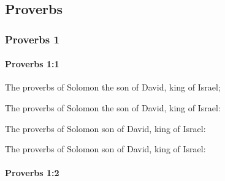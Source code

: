 \subsection{Proverbs}
	\label{PROVERBS}

	\subsubsection{Proverbs 1} %
		\label{PROVERBS-1}

		\paragraph{Proverbs 1:1} %
			\label{PROVERBS-1-1}

			The proverbs of Solomon the son of David, king of Israel;

			\begin{versebox}
					\item[BHS] 
					\item[ASV] The proverbs of Solomon the son of David, king of Israel:
					\item[NIV] The proverbs of Solomon son of David, king of Israel:
					\item[NRSV] The proverbs of Solomon son of David, king of Israel:
			\end{versebox}

		\paragraph{Proverbs 1:2} %
			\label{PROVERBS-1-2}

